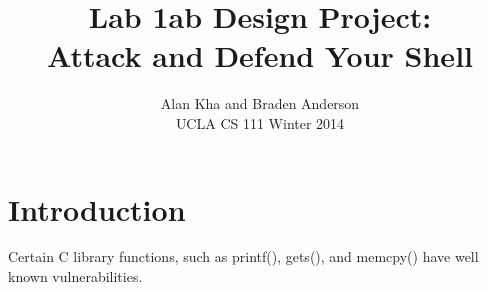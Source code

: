 \documentclass{article}
\begin{document}
\title{Lab 1ab Design Project:\\ Attack and Defend Your Shell}
\author{Alan Kha and Braden Anderson\\ UCLA CS 111 Winter 2014}
\date{}
\maketitle

\section{Introduction}
Certain C library functions, such as printf(), gets(), and memcpy() have well 
known vulnerabilities.
\end{document}
